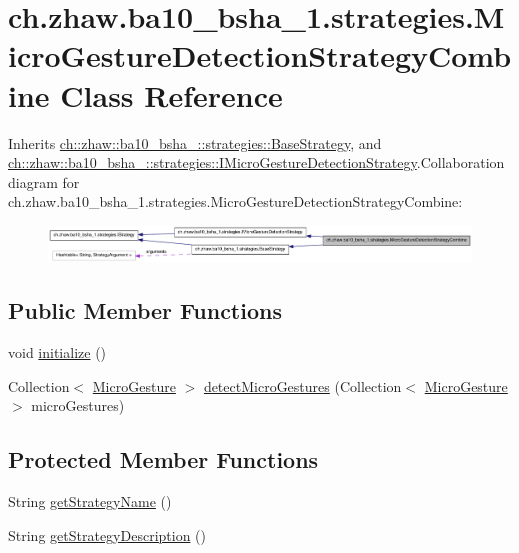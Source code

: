 \hypertarget{classch_1_1zhaw_1_1ba10__bsha__1_1_1strategies_1_1MicroGestureDetectionStrategyCombine}{
\section{ch.zhaw.ba10\_\-bsha\_\-1.strategies.MicroGestureDetectionStrategyCombine Class Reference}
\label{classch_1_1zhaw_1_1ba10__bsha__1_1_1strategies_1_1MicroGestureDetectionStrategyCombine}
}


Inherits \hyperlink{classch_1_1zhaw_1_1ba10__bsha__1_1_1strategies_1_1BaseStrategy}{ch::zhaw::ba10\_\-bsha\_::strategies::BaseStrategy}, and \hyperlink{interfacech_1_1zhaw_1_1ba10__bsha__1_1_1strategies_1_1IMicroGestureDetectionStrategy}{ch::zhaw::ba10\_\-bsha\_::strategies::IMicroGestureDetectionStrategy}.Collaboration diagram for ch.zhaw.ba10\_\-bsha\_\-1.strategies.MicroGestureDetectionStrategyCombine:\nopagebreak
\begin{figure}[H]
\begin{center}
\leavevmode
\includegraphics[width=400pt]{classch_1_1zhaw_1_1ba10__bsha__1_1_1strategies_1_1MicroGestureDetectionStrategyCombine__coll__graph}
\end{center}
\end{figure}
\subsection*{Public Member Functions}
\begin{DoxyCompactItemize}
\item 
void \hyperlink{classch_1_1zhaw_1_1ba10__bsha__1_1_1strategies_1_1MicroGestureDetectionStrategyCombine_ad9982cce2bbecd3246b3838b28bd95e7}{initialize} ()
\item 
Collection$<$ \hyperlink{classch_1_1zhaw_1_1ba10__bsha__1_1_1service_1_1MicroGesture}{MicroGesture} $>$ \hyperlink{classch_1_1zhaw_1_1ba10__bsha__1_1_1strategies_1_1MicroGestureDetectionStrategyCombine_a5487e41dc2d1b6dbe493b5a8420c050f}{detectMicroGestures} (Collection$<$ \hyperlink{classch_1_1zhaw_1_1ba10__bsha__1_1_1service_1_1MicroGesture}{MicroGesture} $>$ microGestures)
\end{DoxyCompactItemize}
\subsection*{Protected Member Functions}
\begin{DoxyCompactItemize}
\item 
String \hyperlink{classch_1_1zhaw_1_1ba10__bsha__1_1_1strategies_1_1MicroGestureDetectionStrategyCombine_ad7fdf02bda8daf2d3bd177e23a270f11}{getStrategyName} ()
\item 
String \hyperlink{classch_1_1zhaw_1_1ba10__bsha__1_1_1strategies_1_1MicroGestureDetectionStrategyCombine_adf4547ec5056bf340c60f15ba50330bc}{getStrategyDescription} ()
\end{DoxyCompactItemize}
